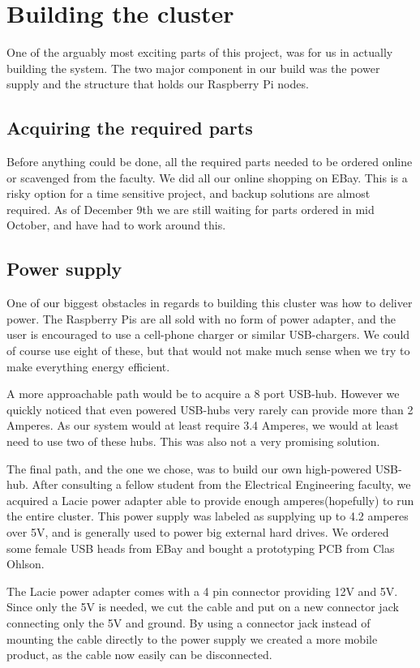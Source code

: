 \clearpage
\section{Building the cluster}
\label{sec:build}
One of the arguably most exciting parts of this project, was for us in actually building the system. The two major component in our build was the power supply and the structure that holds our Raspberry Pi nodes. 

\subsection{Acquiring the required parts}
Before anything could be done, all the required parts needed to be ordered online or scavenged from the faculty. We did all our online shopping on EBay. This is a risky option for a time sensitive project, and backup solutions are almost required. As of December 9th we are still waiting for parts ordered in mid October, and have had to work around this.   

\subsection{Power supply}
One of our biggest obstacles in regards to building this cluster was how to deliver power. The Raspberry Pis are all sold with no form of power adapter, and the user is encouraged to use a cell-phone charger or similar USB-chargers. We could of course use eight of these, but that would not make much sense when we try to make everything energy efficient. 

A more approachable path would be to acquire a 8 port USB-hub. However we quickly noticed that even powered USB-hubs very rarely can provide more than 2 Amperes. As our system would at least require 3.4 Amperes, we would at least need to use two of these hubs. This was also not a very promising solution.

The final path, and the one we chose, was to build our own high-powered USB-hub. After consulting a fellow student from the Electrical Engineering faculty, we acquired a Lacie power adapter able to provide enough amperes(hopefully) to run the entire cluster. This power supply was labeled as supplying up to 4.2 amperes over 5V, and is generally used to power big external hard drives. We ordered some female USB heads from EBay and bought a prototyping PCB from Clas Ohlson.

The Lacie power adapter comes with a 4 pin connector providing 12V and 5V. Since only the 5V is needed, we cut the cable and put on a new connector jack connecting only the 5V and ground. By using a connector jack instead of mounting the cable directly to the power supply we created a more mobile product, as the cable now easily can be disconnected.

